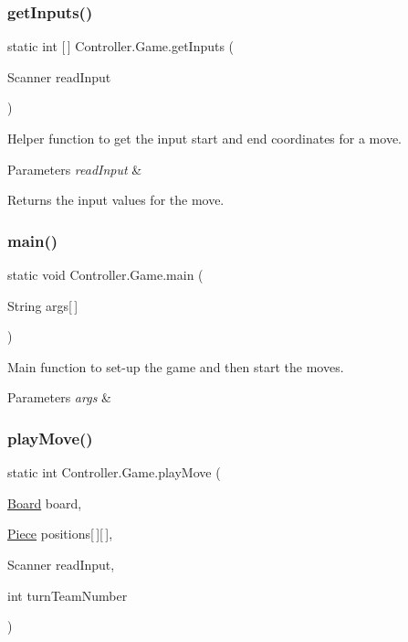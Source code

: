 \subsubsection{\texorpdfstring{get\+Inputs()}{getInputs()}}
{\footnotesize\ttfamily static int \mbox{[}$\,$\mbox{]} Controller.\+Game.\+get\+Inputs (\begin{DoxyParamCaption}\item[{Scanner}]{read\+Input }\end{DoxyParamCaption})\hspace{0.3cm}{\ttfamily [static]}}

Helper function to get the input start and end coordinates for a move. 
\begin{DoxyParams}{Parameters}
{\em read\+Input} & \\
\hline
\end{DoxyParams}
\begin{DoxyReturn}{Returns}
the input values for the move. 
\end{DoxyReturn}
\hypertarget{class_controller_1_1_game_a4835bc44e3401e01fe5ced7dba4b7524}{}\label{class_controller_1_1_game_a4835bc44e3401e01fe5ced7dba4b7524} 
\subsubsection{\texorpdfstring{main()}{main()}}
{\footnotesize\ttfamily static void Controller.\+Game.\+main (\begin{DoxyParamCaption}\item[{String}]{args\mbox{[}$\,$\mbox{]} }\end{DoxyParamCaption})\hspace{0.3cm}{\ttfamily [static]}}

Main function to set-\/up the game and then start the moves. 
\begin{DoxyParams}{Parameters}
{\em args} & \\
\hline
\end{DoxyParams}
\hypertarget{class_controller_1_1_game_a805721bee4d26c4809276e9a0730cbee}{}\label{class_controller_1_1_game_a805721bee4d26c4809276e9a0730cbee} 
\subsubsection{\texorpdfstring{play\+Move()}{playMove()}}
{\footnotesize\ttfamily static int Controller.\+Game.\+play\+Move (\begin{DoxyParamCaption}\item[{\hyperlink{class_model_1_1_board}{Board}}]{board,  }\item[{\hyperlink{class_model_1_1_pieces_1_1_piece}{Piece}}]{positions\mbox{[}$\,$\mbox{]}\mbox{[}$\,$\mbox{]},  }\item[{Scanner}]{read\+Input,  }\item[{int}]{turn\+Team\+Number }\end{DoxyParamCaption})\hspace{0.3cm}{\ttfamily [static]}}

